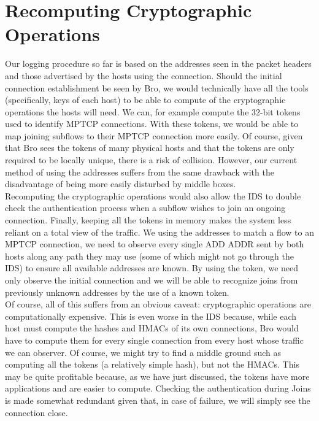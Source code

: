 \section{Recomputing Cryptographic Operations}
Our logging procedure so far is based on the addresses seen in the packet headers and those advertised by the hosts using the connection. Should the initial connection establishment be seen by Bro, we would technically have all the tools (specifically, keys of each host) to be able to compute of the cryptographic operations the hosts will need. We can, for example compute the 32-bit tokens used to identify MPTCP connections. With these tokens, we would be able to map joining subflows to their MPTCP connection more easily. Of course, given that Bro sees the tokens of many physical hosts and that the tokens are only required to be locally unique, there is a risk of collision. However, our current method of using the addresses suffers from the same drawback with the disadvantage of being more easily disturbed by middle boxes. \\

Recomputing the cryptographic operations would also allow the IDS to double check the authentication process when a subflow wishes to join an ongoing connection. Finally, keeping all the tokens in memory makes the system less reliant on a total view of the traffic. We using the addresses to match a flow to an MPTCP connection, we need to observe every single ADD ADDR sent by both hosts along any path they may use (some of which might not go through the IDS) to ensure all available addresses are known. By using the token, we need only observe the initial connection and we will be able to recognize joins from previously unknown addresses by the use of a known token. \\

Of course, all of this suffers from an obvious caveat: cryptographic operations are computationally expensive. This is even worse in the IDS because, while each host must compute the hashes and HMACs of its own connections, Bro would have to compute them for every single connection from every host whose traffic we can observer. Of course, we might try to find a middle ground such as computing all the tokens (a relatively simple hash), but not the HMACs. This may be quite profitable because, as we have just discussed, the tokens have more applications and are easier to compute. Checking the authentication during Joins is made somewhat redundant given that, in case of failure, we will simply see the connection close.



